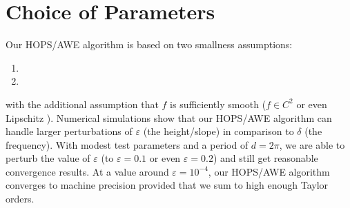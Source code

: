 \section{Choice of Parameters}
\label{Sec: Choice of Parameters}
Our HOPS/AWE algorithm is based on two smallness assumptions:
\begin{enumerate}
\item {}
\vspace{-2mm}
\item {} 
\end{enumerate}
with the additional assumption that $f$ is sufficiently smooth ($f\in C^2$ \cite{NichollsReitich99,NichollsReitich03b} or even Lipschitz \cite{hu2005analyticity}). Numerical simulations show that our HOPS/AWE algorithm can handle larger perturbations of $\varepsilon$ (the height/slope) in comparison to $\delta$ (the frequency). With modest test parameters and a period of $d=2\pi$, we are able to perturb the value of $\varepsilon$ (to $\varepsilon=0.1$ or even $\varepsilon=0.2$) and still get reasonable convergence results. At a value around $\varepsilon = 10^{-4}$, our HOPS/AWE algorithm converges to machine precision provided that we sum to high enough Taylor orders.
\vspace{-13mm}
